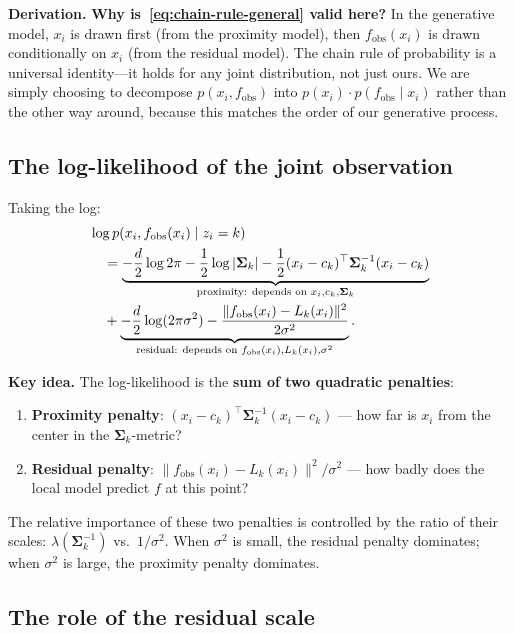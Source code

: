 \documentclass[11pt]{article}
\theoremstyle{definition}
\theoremstyle{plain}
\theoremstyle{remark}
\newcommand{\Sv}{\boldsymbol{\Sigma}}
\newenvironment{keyidea}{\par\medskip\noindent\textbf{Key idea.} }{\par\medskip}
\newenvironment{derivation}{\par\medskip\noindent\textbf{Derivation.} }{\par\medskip}
\begin{document}
\begin{derivation}
\textbf{Why is~\eqref{eq:chain-rule-general} valid here?} In the generative model, $x_i$ is drawn first (from the proximity model), then $f_{\mathrm{obs}}(x_i)$ is drawn conditionally on $x_i$ (from the residual model). The chain rule of probability is a universal identity---it holds for any joint distribution, not just ours. We are simply choosing to decompose $p(x_i,f_{\mathrm{obs}})$ into $p(x_i)\cdot p(f_{\mathrm{obs}}\mid x_i)$ rather than the other way around, because this matches the order of our generative process.
\end{derivation}

\subsection{The log-likelihood of the joint observation}

Taking the log:
\begin{align}
  &\log p(x_i, f_{\mathrm{obs}}(x_i)\mid z_i=k) \notag \\
  &\quad = \underbrace{-\frac{d}{2}\log 2\pi - \frac{1}{2}\log|\Sv_k| - \frac{1}{2}(x_i-c_k)^\top\Sv_k^{-1}(x_i-c_k)}_{\text{proximity: depends on } x_i, c_k, \Sv_k} \notag \\
  &\quad + \underbrace{-\frac{d}{2}\log(2\pi\sigma^2) - \frac{\|f_{\mathrm{obs}}(x_i)-L_k(x_i)\|^2}{2\sigma^2}}_{\text{residual: depends on } f_{\mathrm{obs}}(x_i), L_k(x_i), \sigma^2}. \label{eq:log-joint}
\end{align}

\begin{keyidea}
The log-likelihood is the \textbf{sum of two quadratic penalties}:
\begin{enumerate}[leftmargin=*,itemsep=0pt]
  \item \textbf{Proximity penalty}: $(x_i-c_k)^\top\Sv_k^{-1}(x_i-c_k)$ --- how far is $x_i$ from the center in the $\Sv_k$-metric?
  \item \textbf{Residual penalty}: $\|f_{\mathrm{obs}}(x_i)-L_k(x_i)\|^2/\sigma^2$ --- how badly does the local model predict $f$ at this point?
\end{enumerate}
The relative importance of these two penalties is controlled by the ratio of their scales: $\lambda(\Sv_k^{-1})$ vs.\ $1/\sigma^2$. When $\sigma^2$ is small, the residual penalty dominates; when $\sigma^2$ is large, the proximity penalty dominates.
\end{keyidea}

\subsection{The role of the residual scale}
\end{document}
